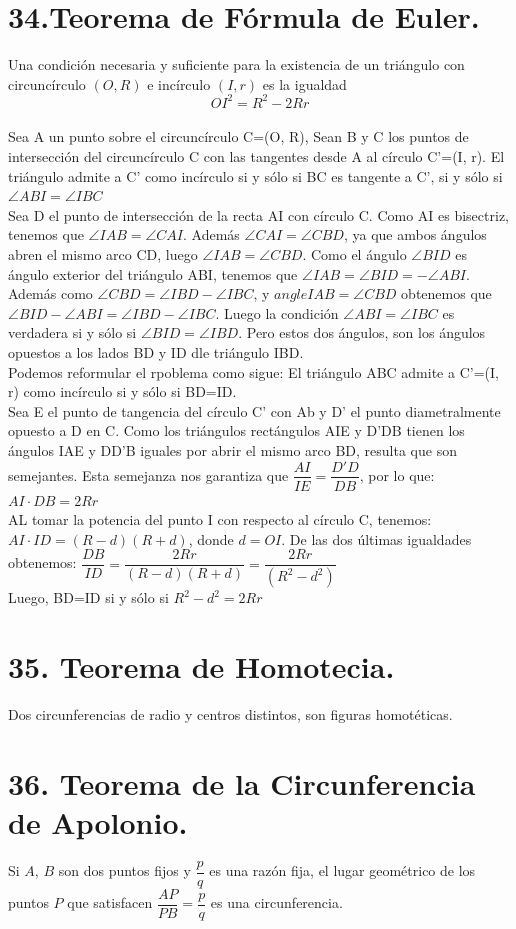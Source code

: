 \documentclass[12pt,a4paper, oneside]{book}
\begin{document}
\section{34.Teorema de Fórmula de Euler.}
Una condición necesaria y suficiente para la existencia de un triángulo con circuncírculo $( O, R)$ e incírculo $(I, r)$ es la igualdad $$OI ^2= R^2 - 2Rr$$
\\
Sea A un punto sobre el circuncírculo C=(O, R), Sean B y C los puntos de intersección del circuncírculo C con las tangentes desde A al círculo C'=(I, r). El triángulo admite a C' como incírculo si y sólo si BC es tangente a C', si y sólo si $\angle ABI= \angle IBC$
\\Sea D el punto de intersección de la recta AI con círculo C. Como AI es bisectriz, tenemos que $\angle IAB= \angle CAI$. Además $\angle CAI= \angle CBD$, ya que ambos ángulos abren el mismo arco CD, luego $\angle IAB= \angle CBD$. Como el ángulo $\angle BID$ es ángulo exterior del triángulo ABI, tenemos que $\angle IAB= \angle BID =- \angle ABI$. Además como $\angle CBD = \angle IBD - \angle IBC$, y $angle IAB= \angle CBD$ obtenemos que $\angle BID - \angle ABI= \angle IBD - \angle IBC$. Luego la condición $\angle ABI = \angle IBC$ es verdadera si y sólo si $\angle BID = \angle IBD$. Pero estos dos ángulos, son los ángulos opuestos a los lados BD y ID dle triángulo IBD.
\\Podemos reformular el rpoblema como sigue: El triángulo ABC admite a C'=(I, r) como incírculo si y sólo si BD=ID.
\\Sea E el punto de tangencia del círculo C' con Ab y D' el punto diametralmente opuesto a D en C. Como los triángulos rectángulos AIE  y D'DB tienen los ángulos IAE y DD'B iguales  por abrir el mismo arco BD, resulta que son semejantes. Esta semejanza nos garantiza que $\dfrac{AI}{IE}= \dfrac{D'D}{DB}$, por lo que: $AI \cdot DB= 2Rr$
\\ AL tomar la potencia del punto I con respecto al círculo C, tenemos: $AI \cdot ID =(R-d)(R+d) $, donde $d=OI$. De las dos últimas igualdades obtenemos:
$\dfrac{DB}{ID}=\dfrac{2Rr}{(R-d)(R+d)}=\dfrac{2Rr}{(R^2-d^2)}$
\\Luego, BD=ID si y sólo si $ R^2- d^2=2Rr$
\section{35. Teorema de Homotecia.}
Dos circunferencias de radio  y centros distintos, son figuras homotéticas.
\section{36. Teorema de la Circunferencia de Apolonio.}
Si $A$, $B$ son dos puntos fijos y $\dfrac{p}{q}$ es una razón fija, el lugar geométrico de los puntos $P$ que satisfacen $\dfrac{AP}{PB}=\dfrac{p}{q}$ es una circunferencia.
\end{document}
